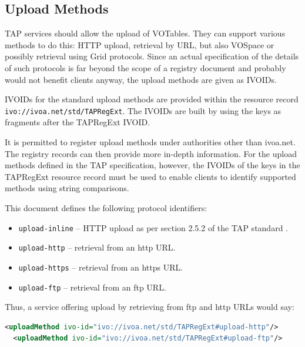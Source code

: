 \documentclass{ivoa}
\begin{document}

\subsection{Upload Methods}

\label{uploadmethods}

TAP services should allow the upload of VOTables.  They can support
various methods to do this: HTTP upload, retrieval by URL, but also VOSpace
or possibly retrieval using Grid protocols.  Since an actual specification
of the details of such protocols is far beyond the scope of a registry
document and probably would not benefit clients anyway, the upload
methods are given as IVOIDs.

IVOIDs for the standard upload methods are provided within the
resource record
\texttt{ivo://ivoa.net/std/TAPRegExt}.
The IVOIDs are built by using the keys as fragments after the
TAPRegExt IVOID.

It is permitted to register upload methods under authorities other than
ivoa.net.
The registry records can then provide more in-depth information. For
the upload methods defined in the TAP specification, however,
the IVOIDs of the keys in the TAPRegExt resource record must be used to enable
clients to identify supported methods using string comparisons.

This document defines the following protocol identifiers:


\begin{itemize}

\item \texttt{upload-inline} -- HTTP upload as per section 2.5.2 of
the TAP standard \citep{2019ivoa.spec.0927D}.{}

\item \texttt{upload-http} -- retrieval from an http URL.{}

\item \texttt{upload-https} -- retrieval from an https URL.{}

\item \texttt{upload-ftp} -- retrieval from an ftp URL.{}

\end{itemize}

Thus, a service offering upload by retrieving from ftp and http URLs
would say:


\begin{lstlisting}[language=XML,basicstyle=\footnotesize]
  <uploadMethod ivo-id="ivo://ivoa.net/std/TAPRegExt#upload-http"/>
  <uploadMethod ivo-id="ivo://ivoa.net/std/TAPRegExt#upload-ftp"/>
\end{lstlisting}
\end{document}
